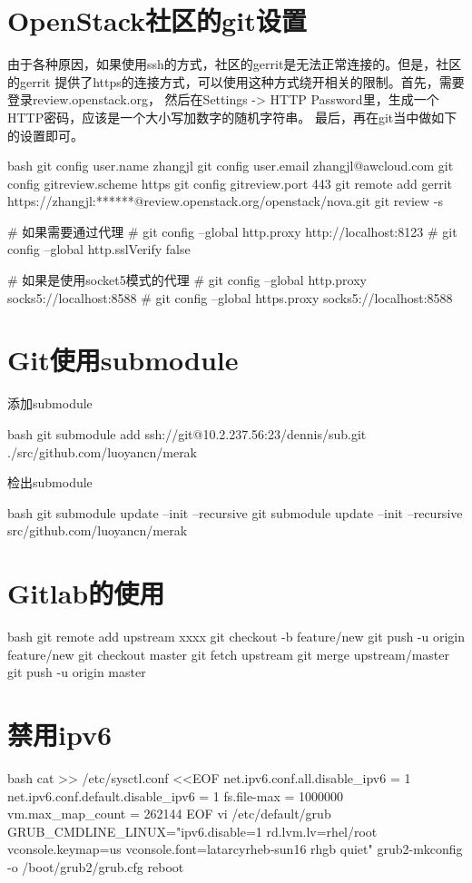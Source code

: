 \section{OpenStack社区的git设置}
由于各种原因，如果使用ssh的方式，社区的gerrit是无法正常连接的。但是，社区的gerrit
提供了https的连接方式，可以使用这种方式绕开相关的限制。首先，需要登录review.openstack.org，
然后在Settings -> HTTP Password里，生成一个HTTP密码，应该是一个大小写加数字的随机字符串。
最后，再在git当中做如下的设置即可。
\begin{code-block}{bash}
git config user.name zhangjl
git config user.email zhangjl@awcloud.com
git config gitreview.scheme https
git config gitreview.port 443
git remote add gerrit https://zhangjl:******@review.openstack.org/openstack/nova.git
git review -s

# 如果需要通过代理
# git config --global http.proxy http://localhost:8123
# git config --global http.sslVerify false

# 如果是使用socket5模式的代理
# git config --global http.proxy socks5://localhost:8588
# git config --global https.proxy socks5://localhost:8588
\end{code-block}

\section{Git使用submodule}
添加submodule
\begin{code-block}{bash}
git submodule add ssh://git@10.2.237.56:23/dennis/sub.git ./src/github.com/luoyancn/merak
\end{code-block}
检出submodule
\begin{code-block}{bash}
git submodule update --init --recursive
git submodule update --init --recursive src/github.com/luoyancn/merak
\end{code-block}

\section{Gitlab的使用}
\begin{code-block}{bash}
git remote add upstream xxxx
git checkout -b feature/new
git push -u origin feature/new
git checkout master
git fetch upstream
git merge upstream/master
git push -u origin master
\end{code-block}

\section{禁用ipv6}
\begin{code-block}{bash}
cat >> /etc/sysctl.conf <<EOF
net.ipv6.conf.all.disable_ipv6 = 1
net.ipv6.conf.default.disable_ipv6 = 1
fs.file-max = 1000000
vm.max_map_count = 262144
EOF
vi /etc/default/grub
GRUB_CMDLINE_LINUX="ipv6.disable=1 rd.lvm.lv=rhel/root vconsole.keymap=us vconsole.font=latarcyrheb-sun16 rhgb quiet"
grub2-mkconfig -o /boot/grub2/grub.cfg
reboot
\end{code-block}

